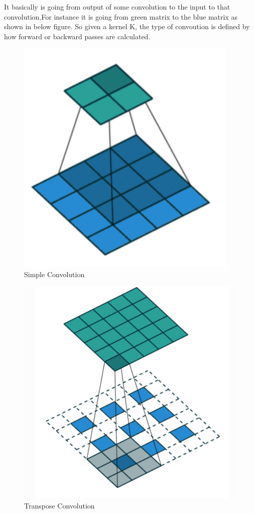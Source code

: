 \par
It basically is going from output of some convolution to the input to that convolution.For instance it is going from green matrix to the blue matrix as shown in below figure. So given a kernel K, the type of convoution is defined by how forward or backward passes are calculated\cite{Deconv-Theano}.


\begin{figure}[ht]
  \centering
    \includegraphics[scale=.5, angle=0]{Files/simple-conv.png}
    \caption[Simple Convolution]{Simple Convolution \cite{Deconv-Theano}}
    \label{fig: Simple Convolution}
\end{figure}

\begin{figure}[ht]
  \centering
    \includegraphics[scale=.4, angle=0]{Files/Frational-Stride-Conv.png}
    \caption[Transpose Convolution ]{Transpose Convolution \cite{Deconv-Theano}}
    \label{fig: Strided Convolution}
\end{figure}



